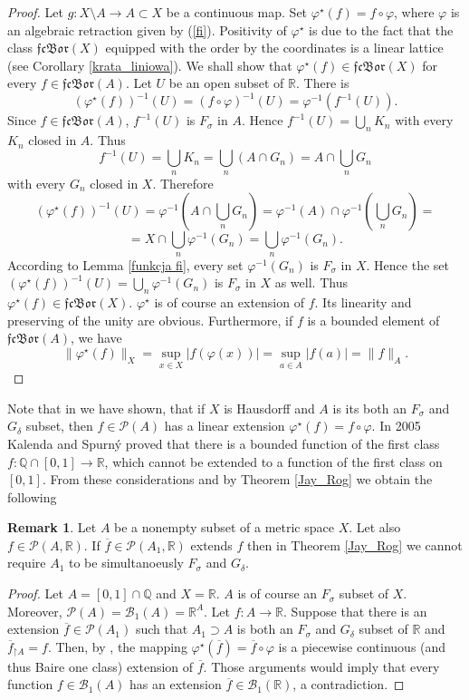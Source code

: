 \documentclass{amsart}
\theoremstyle{definition}
\newtheorem{Uw}{Remark}
\newcommand\mR{{\mathbb R}}
\newcommand\mQ{{\mathbb Q}}
\newcommand\restr{\mathord{\restriction}}
\newcommand\B{{\mathscr B}}
\newcommand\PC{{\mathscr{P}}}
\newcommand\cn{\colon}
\newcommand\ol{\overline}
\newcommand\fs{F_\sigma}
\newcommand\gd{G_\delta}
\newcommand\fcb{\mathfrak{fcBor}}
\newcommand\fii{{\varphi}}
\begin{document}
\begin{proof}
Let $g\cn X\setminus A\to A\subset X$ be a continuous map. Set $\fii^\star(f)=f\circ\fii$, where $\fii$ is an 
algebraic retraction given by (\ref{fi}). Positivity of $\fii^{\star}$ is due to the fact that the class $\fcb(X)$ 
equipped with the order by the coordinates is a linear lattice (see Corollary \ref{krata_liniowa}).
We shall show that $\fii^{\star}(f)\in\fcb(X)$ for every $f\in\fcb(A)$. Let $U$ be an open subset of $\mR$. There is
$$
\left(\fii^{\star}(f)\right)^{-1}(U)=(f\circ \fii)^{-1}(U)=\fii^{-1}\left(f^{-1}(U)\right).
$$
Since $f\in\fcb(A)$, $f^{-1}(U)$ is $\fs$ in $A$. Hence $f^{-1}(U)=\bigcup_{n}K_n$ with every $K_n$ closed in $A$. Thus
$$
f^{-1}(U)=\bigcup_{n}K_n=\bigcup_{n}(A\cap G_n)=A\cap\bigcup_{n}G_n
$$
with every $G_n$ closed in $X$. Therefore
$$
\left(\fii^{\star}(f)\right)^{-1}(U)=\fii^{-1}\left(A\cap\bigcup_{n}G_n\right)=\fii^{-1}(A)\cap\fii^{-1}\left(\bigcup_{n}G_n\right)=
$$
$$
=X\cap\bigcup_{n}\fii^{-1}(G_n)=\bigcup_{n}\fii^{-1}(G_n).
$$
According to Lemma \ref{funkcja fi}, every set $\fii^{-1}(G_n)$ is $\fs$ in $X$. Hence the set
$\left(\fii^{\star}(f)\right)^{-1}(U)=\bigcup_{n}\fii^{-1}(G_n)$ is $\fs$ in $X$ as well.
Thus $\fii^{\star}(f)\in\fcb(X)$.
$\fii^{\star}$ is of course an extension of $f$. Its linearity and preserving of the unity are obvious.
Furthermore, if $f$ is a bounded element of $\fcb(A)$, we have
$$
\|\fii^{\star}(f)\|_X=\sup_{x\in X}|f\left(\fii(x)\right)|=\sup_{a\in A}|f(a)|=\|f\|_A.
$$
\end{proof}

Note that in \cite[Th. 3]{SiegWojtowicz} we have shown, that if $X$ is Hausdorff and $A$ is its both an $\fs$ and $\gd$ subset, then $f\in\PC(A)$ has
a linear extension $\fii^{\star}(f)=f\circ\fii$. In 2005 Kalenda and Spurn\'y proved \cite[Ex. 10]{KalendaSpurny} that there is a bounded function of the
first class $f\cn\mQ\cap[0,1]\to\mR$, which cannot be extended to a function of the first class on $[0,1]$.
From these considerations and by Theorem \ref{Jay_Rog} we obtain the following
\begin{Uw}
Let $A$ be a nonempty subset of a metric space $X$. Let also $f\in\PC(A,\mR)$. If $\ol{f}\in\PC(A_1,\mR)$ extends $f$
then in Theorem \ref{Jay_Rog} we cannot require $A_1$ to be simultanoeusly $\fs$ and $\gd$.
\end{Uw}
\begin{proof}
Let $A=[0,1]\cap\mQ$ and $X=\mR$. $A$ is of course an $\fs$ subset of $X$. Moreover, $\PC(A)=\B_1(A)=\mR^A$. Let $f\cn A\to\mR$. Suppose that there is
an extension $\ol{f}\in\PC(A_1)$ such that $A_1\supset A$ is both an $\fs$ and $\gd$ subset of $\mR$ and $\ol{f}_{\restr A}=f$. Then, by
\cite[Th. 3]{SiegWojtowicz}, the mapping $\fii^{\star}(\ol{f})=\ol{f}\circ\fii$ is a piecewise continuous (and thus Baire one class) extension of $\ol{f}$.
Those arguments would imply that every function $f\in\B_1(A)$ has an extension $\ol{f}\in\B_1(\mR)$, a contradiction.
\end{proof}
\end{document}
